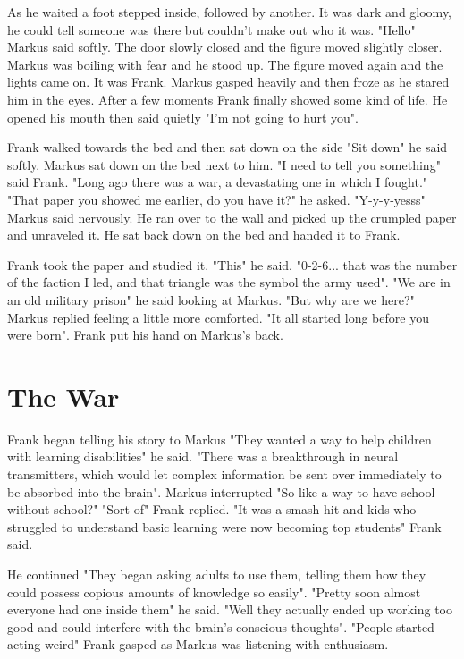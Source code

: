 \documentclass[12pt]{book}
\begin{document}
As he waited a foot stepped inside, followed by another. It was dark and gloomy, he could tell someone was there but couldn't make out who it was. "Hello" Markus said softly. The door slowly closed and the figure moved slightly closer. Markus was boiling with fear and he stood up. The figure moved again and the lights came on. It was Frank. Markus gasped heavily and then froze as he stared him in the eyes. After a few moments Frank finally showed some kind of life. He opened his mouth then said quietly "I'm not going to hurt you".

Frank walked towards the bed and then sat down on the side "Sit down" he said softly. Markus sat down on the bed next to him. "I need to tell you something" said Frank. "Long ago there was a war, a devastating one in which I fought." "That paper you showed me earlier, do you have it?" he asked. "Y-y-y-yesss" Markus said nervously. He ran over to the wall and picked up the crumpled paper and unraveled it. He sat back down on the bed and handed it to Frank.

Frank took the paper and studied it. "This" he said. "0-2-6... that was the number of the faction I led, and that triangle was the symbol the army used". "We are in an old military prison" he said looking at Markus. "But why are we here?" Markus replied feeling a little more comforted. "It all started long before you were born". Frank put his hand on Markus's back.

\chapter{The War}

Frank began telling his story to Markus "They wanted a way to help children with learning disabilities" he said. "There was a breakthrough in neural transmitters, which would let complex information be sent over immediately to be absorbed into the brain". Markus interrupted "So like a way to have school without school?" "Sort of" Frank replied. "It was a smash hit and kids who struggled to understand basic learning were now becoming top students" Frank said.

He continued "They began asking adults to use them, telling them how they could possess copious amounts of knowledge so easily". "Pretty soon almost everyone had one inside them" he said. "Well they actually ended up working too good and could interfere with the brain's conscious thoughts". "People started acting weird" Frank gasped as Markus was listening with enthusiasm.
\end{document}
